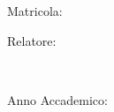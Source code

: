 \begin{titlepage}
\begin{center}
        \normalsize Matricola: \\
        \Large {}
        
        \bigskip
        
        \normalsize Relatore: \\
        \Large {}

        \vfill ~ \vfill ~ \vfill
        
        \normalsize Anno Accademico: \\
        \Large {}


                   

    \end{center}        

\end{titlepage} 